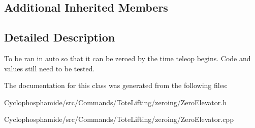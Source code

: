 \subsection*{Additional Inherited Members}


\subsection{Detailed Description}
To be ran in auto so that it can be zeroed by the time teleop begins. Code and values still need to be tested. 

The documentation for this class was generated from the following files\+:\begin{DoxyCompactItemize}
\item 
Cyclophosphamide/src/\+Commands/\+Tote\+Lifting/zeroing/Zero\+Elevator.\+h\item 
Cyclophosphamide/src/\+Commands/\+Tote\+Lifting/zeroing/Zero\+Elevator.\+cpp\end{DoxyCompactItemize}
